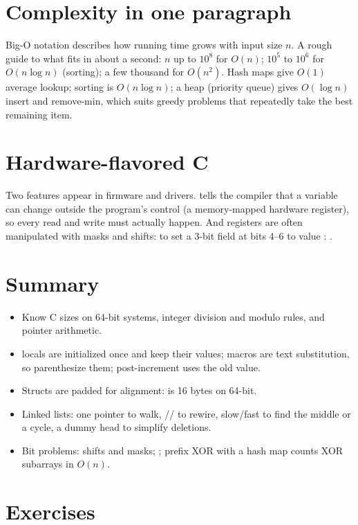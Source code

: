 \section{Complexity in one paragraph}

Big-O notation describes how running time grows with input size $n$. A rough guide to what fits in about a second: $n$ up to $10^8$ for $O(n)$; $10^5$ to $10^6$ for $O(n \log n)$ (sorting); a few thousand for $O(n^2)$. Hash maps give $O(1)$ average lookup; sorting is $O(n \log n)$; a heap (priority queue) gives $O(\log n)$ insert and remove-min, which suits greedy problems that repeatedly take the best remaining item.

\section{Hardware-flavored C}

Two features appear in firmware and drivers.  tells the compiler that a variable can change outside the program's control (a memory-mapped hardware register), so every read and write must actually happen. And registers are often manipulated with masks and shifts: to set a 3-bit field at bits 4--6 to value : .

\section{Summary}

\begin{itemize}
  \item Know C sizes on 64-bit systems, integer division and modulo rules, and pointer arithmetic.
  \item {} locals are initialized once and keep their values; macros are text substitution, so parenthesize them; post-increment uses the old value.
  \item Structs are padded for alignment:  is 16 bytes on 64-bit.
  \item Linked lists: one pointer to walk, // to rewire, slow/fast to find the middle or a cycle, a dummy head to simplify deletions.
  \item Bit problems: shifts and masks; ; prefix XOR with a hash map counts XOR subarrays in $O(n)$.
\end{itemize}

\section{Exercises}

